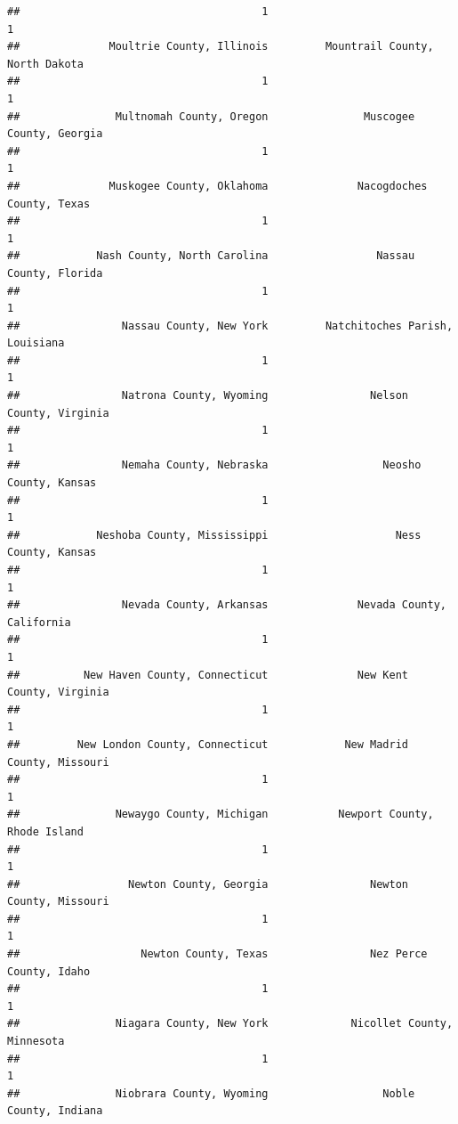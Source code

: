 \documentclass[
]{article}
\begin{document}
\begin{verbatim}
##                                      1                                      1 
##              Moultrie County, Illinois         Mountrail County, North Dakota 
##                                      1                                      1 
##               Multnomah County, Oregon               Muscogee County, Georgia 
##                                      1                                      1 
##              Muskogee County, Oklahoma              Nacogdoches County, Texas 
##                                      1                                      1 
##            Nash County, North Carolina                 Nassau County, Florida 
##                                      1                                      1 
##                Nassau County, New York         Natchitoches Parish, Louisiana 
##                                      1                                      1 
##                Natrona County, Wyoming                Nelson County, Virginia 
##                                      1                                      1 
##                Nemaha County, Nebraska                  Neosho County, Kansas 
##                                      1                                      1 
##            Neshoba County, Mississippi                    Ness County, Kansas 
##                                      1                                      1 
##                Nevada County, Arkansas              Nevada County, California 
##                                      1                                      1 
##          New Haven County, Connecticut              New Kent County, Virginia 
##                                      1                                      1 
##         New London County, Connecticut            New Madrid County, Missouri 
##                                      1                                      1 
##               Newaygo County, Michigan           Newport County, Rhode Island 
##                                      1                                      1 
##                 Newton County, Georgia                Newton County, Missouri 
##                                      1                                      1 
##                   Newton County, Texas                Nez Perce County, Idaho 
##                                      1                                      1 
##               Niagara County, New York             Nicollet County, Minnesota 
##                                      1                                      1 
##               Niobrara County, Wyoming                  Noble County, Indiana 

\end{verbatim}
\end{document}
